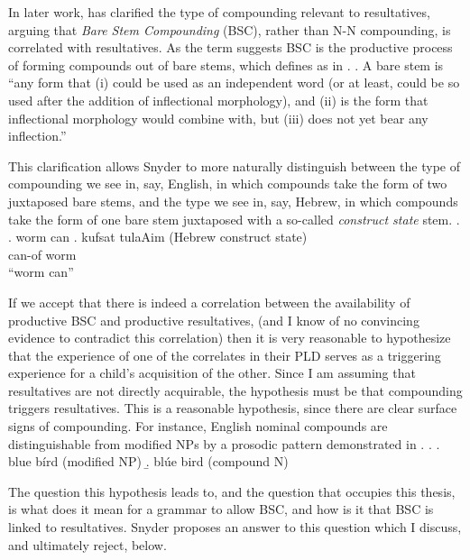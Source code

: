 \documentclass[MilwayThesis]{subfiles}
\begin{document}

In later work, \textcite{snyder2016compound} has clarified the type of compounding relevant to resultatives, arguing that \textit{Bare Stem Compounding} (BSC), rather than N-N compounding, is correlated with resultatives.
As the term suggests BSC is the productive process of forming compounds out of bare stems, which \textcite{snyder2016compound} defines as in \Next.
\ex. A bare stem is ``any form that (i) could be used as an independent word (or at least, could be so used after the addition of inflectional morphology), and (ii) is the form that inflectional morphology would combine with, but (iii) does not yet bear any inflection.'' \parencite[90]{snyder2016compound} 

This clarification allows Snyder to more naturally distinguish between the type of compounding we see in, say, English, in which compounds take the form of two juxtaposed bare stems, and the type we see in, say, Hebrew, in which compounds take the form of one bare stem juxtaposed with a so-called \textit{construct state} stem.
\ex.
\a. worm can 
\bg. kufsat tulaAim {(Hebrew construct state)}\\
can-of worm {}\\
``worm can''\hfill\parencite[338]{snyder2001nature}


If we accept that there is indeed a correlation between the availability of productive BSC and productive resultatives, (and I know of no convincing evidence to contradict this correlation) then it is very reasonable to hypothesize that the experience of one of the correlates in their PLD serves as a triggering experience for a child's acquisition of the other.
Since I am assuming that resultatives are not directly acquirable, the hypothesis must be that compounding triggers resultatives.
This is a reasonable hypothesis, since there are clear surface signs of compounding.
For instance, English nominal compounds are distinguishable from modified NPs by a prosodic pattern demonstrated in \Next.
\ex.
\a. blue b\'ird (modified NP)
\b. bl\'ue bird (compound N)

The question this hypothesis leads to, and the question that occupies this thesis, is what does it mean for a grammar to allow BSC, and how is it that BSC is linked to resultatives.
Snyder proposes an answer to this question which I discuss, and ultimately reject, below.
\end{document}
